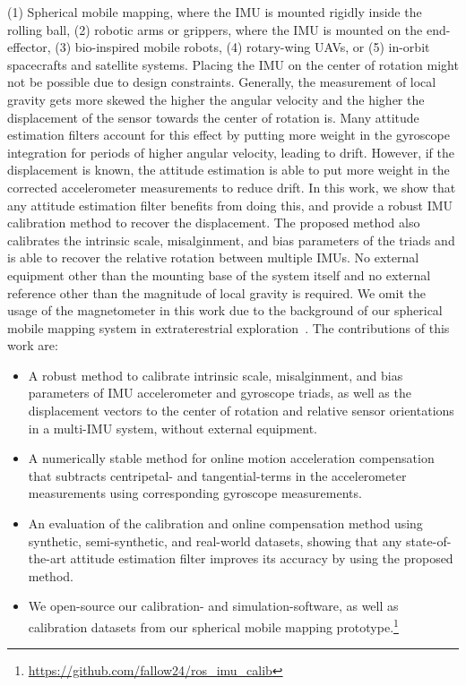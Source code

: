 \documentclass[journal]{IEEEtran}
\begin{document}
(1) Spherical mobile mapping, where the IMU is mounted rigidly inside the rolling ball, (2) robotic arms or grippers, where the IMU is mounted on the end-effector, (3) bio-inspired mobile robots, (4) rotary-wing UAVs, or (5) in-orbit spacecrafts and satellite systems.
Placing the IMU on the center of rotation might not be possible due to design constraints.
Generally, the measurement of local gravity gets more skewed the higher the angular velocity and the higher the displacement of the sensor towards the center of rotation is. 
Many attitude estimation filters account for this effect by putting more weight in the gyroscope integration for periods of higher angular velocity, leading to drift.
However, if the displacement is known, the attitude estimation is able to put more weight in the corrected accelerometer measurements to reduce drift.
In this work, we show that any attitude estimation filter benefits from doing this, and provide a robust IMU calibration method to recover the displacement.
The proposed method also calibrates the intrinsic scale, misalginment, and bias parameters of the triads and is able to recover the relative rotation between multiple IMUs.
No external equipment other than the mounting base of the system itself and no external reference other than the magnitude of local gravity is required.
We omit the usage of the magnetometer in this work due to the background of our spherical mobile mapping system in extraterestrial exploration~\cite{deadalus}.
The contributions of this work are:
\begin{itemize}
  \item A robust method to calibrate intrinsic scale, misalginment, and bias parameters of IMU accelerometer and gyroscope triads, as well as the displacement vectors to the center of rotation and relative sensor orientations in a multi-IMU system, without external equipment.
  \item A numerically stable method for online motion acceleration compensation that subtracts centripetal- and tangential-terms in the accelerometer measurements using corresponding gyroscope measurements.
  \item An evaluation of the calibration and online compensation method using synthetic, semi-synthetic, and real-world datasets, showing that any state-of-the-art attitude estimation filter improves its accuracy by using the proposed method. 
  \item We open-source our calibration- and simulation-software, as well as calibration datasets from our spherical mobile mapping prototype.\footnote{\url{https://github.com/fallow24/ros_imu_calib}}
\end{itemize}
\end{document}

